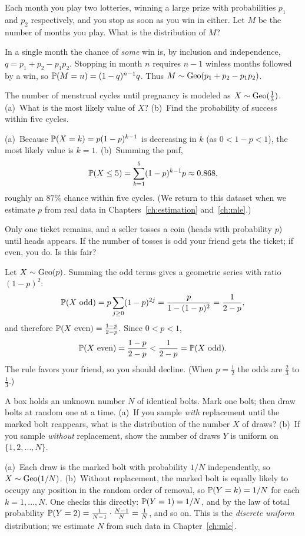 \begin{example}
Each month you play two lotteries, winning a large prize with probabilities
$p_1$ and $p_2$ respectively, and you stop as soon as you win in either. Let $M$
be the number of months you play. What is the distribution of $M$?

\solution In a single month the chance of \emph{some} win is, by inclusion and
independence, $q=p_1+p_2-p_1p_2$. Stopping in month $n$ requires $n-1$ winless
months followed by a win, so $\mathbb{P}(M=n)=(1-q)^{n-1}q$. Thus
$M\sim\mathrm{Geo}(p_1+p_2-p_1p_2)$.
\end{example}

\begin{example}
The number of menstrual cycles until pregnancy is modeled as
$X\sim\mathrm{Geo}(\tfrac13)$. (a)~What is the most likely value of $X$? (b)~Find the
probability of success within five cycles.

\solution (a)~Because $\mathbb{P}(X=k)=p(1-p)^{k-1}$ is decreasing in $k$ (as
$0<1-p<1$), the most likely value is $k=1$. (b)~Summing the pmf,
\[
  \mathbb{P}(X\le 5)=\sum_{k=1}^{5}(1-p)^{k-1}p\approx 0.868,
\]
roughly an $87\%$ chance within five cycles. (We return to this dataset when we
estimate $p$ from real data in Chapters~\ref{ch:estimation} and~\ref{ch:mle}.)
\end{example}

\begin{example}
Only one ticket remains, and a seller tosses a coin (heads with probability
$p$) until heads appears. If the number of tosses is odd your friend gets the
ticket; if even, you do. Is this fair?

\solution Let $X\sim\mathrm{Geo}(p)$. Summing the odd terms gives a geometric series with
ratio $(1-p)^2$:
\[
  \mathbb{P}(X\text{ odd})=p\sum_{j\ge 0}(1-p)^{2j}=\frac{p}{1-(1-p)^2}=\frac{1}{2-p},
\]
and therefore $\mathbb{P}(X\text{ even})=\frac{1-p}{2-p}$. Since $0<p<1$,
\[
  \mathbb{P}(X\text{ even})=\frac{1-p}{2-p}<\frac{1}{2-p}=\mathbb{P}(X\text{ odd}).
\]
The rule favors your friend, so you should decline. (When $p=\tfrac12$ the odds
are $\tfrac23$ to $\tfrac13$.)
\end{example}

\begin{example}
A box holds an unknown number $N$ of identical bolts. Mark one bolt; then draw
bolts at random one at a time. (a)~If you sample \emph{with} replacement until
the marked bolt reappears, what is the distribution of the number $X$ of draws?
(b)~If you sample \emph{without} replacement, show the number of draws $Y$ is
uniform on $\{1,2,\dots,N\}$.

\solution (a)~Each draw is the marked bolt with probability $1/N$ independently,
so $X\sim\mathrm{Geo}(1/N)$. (b)~Without replacement, the marked bolt is equally likely
to occupy any position in the random order of removal, so $\mathbb{P}(Y=k)=1/N$ for
each $k=1,\dots,N$. One checks this directly: $\mathbb{P}(Y=1)=1/N$, and by the law
of total probability
$\mathbb{P}(Y=2)=\tfrac{1}{N-1}\cdot\tfrac{N-1}{N}=\tfrac1N$, and so on. This is the
\emph{discrete uniform} distribution; we estimate $N$ from such data in
Chapter~\ref{ch:mle}.
\end{example}

